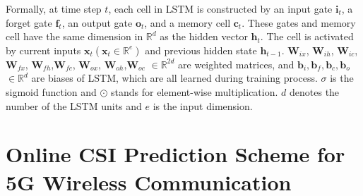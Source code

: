 \documentclass[10pt,conference,letterpaper]{IEEEtran}
\begin{document}
Formally, at time step $t$, each cell in LSTM is constructed by an input gate $\textbf{i}_{t}$, a forget gate $\textbf{f}_{t}$, an output gate $\textbf{o}_{t}$, and a memory cell $\textbf{c}_{t}$. These gates and memory cell have the same dimension in ${\mathbb{R}^{d}}$ as the hidden vector $\mathbf{h}_t$. The cell is activated by current inputs $\textbf{x}_{t}$$(\textbf{x}_t \in {\mathbb{R}^{e}})$ and previous hidden state $\textbf{h}_{t-1}$. $\mathbf{W}_{ix}$, $\mathbf{W}_{ih}$, $\mathbf{W}_{ic}$, $\mathbf{W}_{fx}$, $\mathbf{W}_{fh}$,$\mathbf{W}_{fc}$, $\mathbf{W}_{ox}$, $\mathbf{W}_{oh}$,$\mathbf{W}_{oc}$ $\in {\mathbb{R}^{2d}}$ are weighted matrices, and $\textbf{b}_i, \textbf{b}_f, \textbf{b}_c, \textbf{b}_o$ $\in {\mathbb{R}^{d}}$ are biases of LSTM, which are all learned during training process. $\sigma$ is the sigmoid function and $\odot$ stands for element-wise multiplication. $d$ denotes the number of the LSTM units and $e$ is the input dimension.

\section{Online CSI Prediction Scheme for 5G Wireless Communication}
\end{document}
